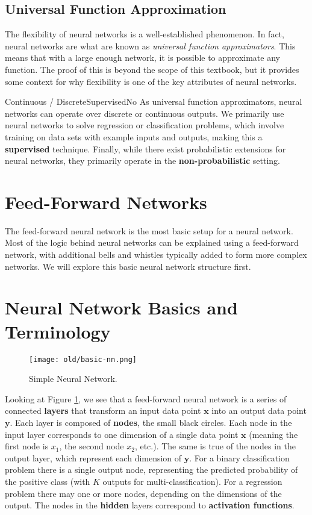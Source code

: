 \subsection{Universal Function Approximation}
The flexibility of neural networks is a well-established phenomenon. In fact, neural networks are what are known as \textit{universal function approximators}. This means that with a large enough network, it is possible to approximate any function. The proof of this is beyond the scope of this textbook, but it provides some context for why flexibility is one of the key attributes of neural networks.

\begin{mlcube}{Continuous / Discrete}{Supervised}{No}
    As universal function approximators, neural networks can operate over discrete or continuous outputs. We primarily use neural networks to solve regression or classification problems, which involve training on data sets with example inputs and outputs, making this a \textbf{supervised} technique. Finally, while there exist probabilistic extensions for neural networks, they primarily operate in the \textbf{non-probabilistic} setting.
\end{mlcube}

\section{Feed-Forward Networks}
The feed-forward neural network is the most basic setup for a neural network. Most of the logic behind neural networks can be explained using a feed-forward network, with additional bells and whistles typically added to form more complex networks. We will explore this basic neural network structure first.

\section{Neural Network Basics and Terminology}

\begin{figure}
    \centering
    \texttt{[image: old/basic-nn.png]}
    \caption{Simple Neural Network.}
    \label{fig:basic-nn}
\end{figure}

Looking at Figure \ref{fig:basic-nn}, we see that a feed-forward neural network is a series of connected \textbf{layers} that transform an input data point $\textbf{x}$ into an output data point $\textbf{y}$. Each layer is composed of \textbf{nodes}, the small black circles. Each node in the input layer corresponds to one dimension of a single data point $\textbf{x}$ (meaning the first node is $x_1$, the second node $x_2$, etc.). The same is true of the nodes in the output layer, which represent each dimension of $\textbf{y}$.  For a binary classification problem there is a single output node, representing the predicted probability of the positive class (with $K$ outputs for multi-classification). For a regression problem there may one or more nodes, depending on the dimensions of the output.  The nodes in the  \textbf{hidden} layers correspond to  \textbf{activation functions}.

